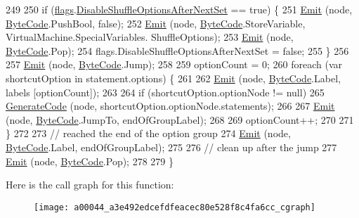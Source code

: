 \begin{DoxyCode}
249 
250             \textcolor{keywordflow}{if} (\hyperlink{a00044_a541022d89bcf9bc8f794eb6d6b438d08}{flags}.\hyperlink{a00044_a8b49bb7763ff477cba21d7c771ef3ed0}{DisableShuffleOptionsAfterNextSet} == \textcolor{keyword}{true}) \{
251                 \hyperlink{a00044_a774e8c143cdda0584fcfdda98626a83c}{Emit} (node, \hyperlink{a00041_ad5dfb6ee68ca7469623ad3e459f98894}{ByteCode}.PushBool, \textcolor{keyword}{false});
252                 \hyperlink{a00044_a774e8c143cdda0584fcfdda98626a83c}{Emit} (node, \hyperlink{a00041_ad5dfb6ee68ca7469623ad3e459f98894}{ByteCode}.StoreVariable, VirtualMachine.SpecialVariables.
      ShuffleOptions);
253                 \hyperlink{a00044_a774e8c143cdda0584fcfdda98626a83c}{Emit} (node, \hyperlink{a00041_ad5dfb6ee68ca7469623ad3e459f98894}{ByteCode}.Pop);
254                 flags.DisableShuffleOptionsAfterNextSet = \textcolor{keyword}{false};
255             \}
256 
257             \hyperlink{a00044_a774e8c143cdda0584fcfdda98626a83c}{Emit} (node, \hyperlink{a00041_ad5dfb6ee68ca7469623ad3e459f98894}{ByteCode}.Jump);
258 
259             optionCount = 0;
260             \textcolor{keywordflow}{foreach} (var shortcutOption \textcolor{keywordflow}{in} statement.options) \{
261 
262                 \hyperlink{a00044_a774e8c143cdda0584fcfdda98626a83c}{Emit} (node, \hyperlink{a00041_ad5dfb6ee68ca7469623ad3e459f98894}{ByteCode}.Label, labels [optionCount]);
263 
264                 \textcolor{keywordflow}{if} (shortcutOption.optionNode != null)
265                     \hyperlink{a00044_a006f3becd521cc179ba3d3352f6f930b}{GenerateCode} (node, shortcutOption.optionNode.statements);
266 
267                 \hyperlink{a00044_a774e8c143cdda0584fcfdda98626a83c}{Emit} (node, \hyperlink{a00041_ad5dfb6ee68ca7469623ad3e459f98894}{ByteCode}.JumpTo, endOfGroupLabel);
268 
269                 optionCount++;
270 
271             \}
272 
273             \textcolor{comment}{// reached the end of the option group}
274             \hyperlink{a00044_a774e8c143cdda0584fcfdda98626a83c}{Emit} (node, \hyperlink{a00041_ad5dfb6ee68ca7469623ad3e459f98894}{ByteCode}.Label, endOfGroupLabel);
275 
276             \textcolor{comment}{// clean up after the jump}
277             \hyperlink{a00044_a774e8c143cdda0584fcfdda98626a83c}{Emit} (node, \hyperlink{a00041_ad5dfb6ee68ca7469623ad3e459f98894}{ByteCode}.Pop);
278 
279         \}
\end{DoxyCode}


Here is the call graph for this function\-:
\nopagebreak
\begin{figure}[H]
\begin{center}
\leavevmode
\texttt{[image: a00044\_a3e492edcefdfeacec80e528f8c4fa6cc\_cgraph]}
\end{center}
\end{figure}


